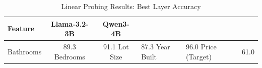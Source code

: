 \begin{table}[h]
\centering
\caption{Linear Probing Results: Best Layer Accuracy}
\begin{tabular}{lcc}
\toprule
Feature & Llama-3.2-3B & Qwen3-4B \\
\midrule
Bathrooms & 89.3%
Bedrooms & 91.1%
Lot Size & 87.3%
Year Built & 96.0%
Price (Target) & 61.0%
\bottomrule
\end{tabular}
\end{table}